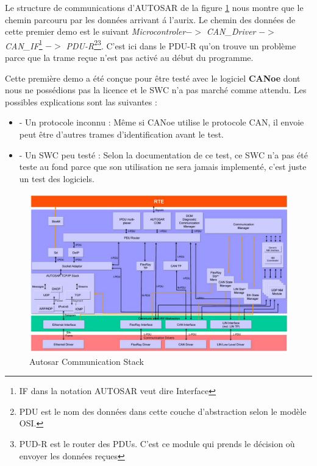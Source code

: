 Le structure de communications d'AUTOSAR de la figure \ref{fig:autosar-com-stack} nous montre que le chemin parcouru par les donn\'ees arrivant \'a l'aurix. Le chemin des donn\'ees de cette premier demo est le suivant \textit{Microcontroler}$ ->$ \textit{CAN\_Driver}\cite{can_drv_man} $->$ \textit{CAN\_IF}\footnote{IF dans la notation AUTOSAR veut dire Interface}\cite{can_if_man} $->$ \textit{PDU-R}\footnote{PDU est le nom des donn\'ees dans cette couche d'abstraction selon le mod\`ele OSI\cite{osi-model}.}\footnote{PUD-R\cite{pdu_r_man} est le router des PDUs. C'est ce module qui prends le décision o\`u envoyer les donn\'ees re\c cues}\cite{pdu_r_man}. C'est ici dans le PDU-R qu'on trouve un probl\`eme parce que la trame re\c cue n'est pas activ\'e au début du programme.

Cette première demo a \'et\'e con\c cue pour \^etre test\'e avec le logiciel \textbf{CANoe}\cite{canoe} dont nous ne possédions pas la licence et le SWC n'a pas march\'e comme attendu. Les possibles explications sont las suivantes :

\begin{itemize}
    \item - Un protocole inconnu : Même si CANoe utilise le protocole CAN, il envoie peut \^etre d'autres trames d'identification avant le test.
    \item - Un SWC peu test\'e : Selon la documentation de ce test, ce SWC n'a pas \'et\'e teste au fond parce que son utilisation ne sera jamais implement\'e, c'est juste un test des logiciels.
\end{itemize}

\begin{figure}[!htb]
 \centering
 \includegraphics[width=\textwidth]{img/autosar_com_stack.png}
 \caption{Autosar Communication Stack\cite{sock_adp_man}}
 \label{fig:autosar-com-stack}
\end{figure}

